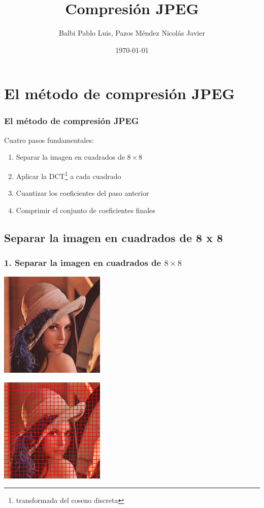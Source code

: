 \documentclass{beamer}
\begin{document}
\title{Compresión JPEG}
\author{Balbi Pablo Luis, Pazos Méndez Nicolás Javier}
\date{\today}

\begin{frame}
    \titlepage
\end{frame}

\section{El método de compresión JPEG}
\begin{frame}
    \frametitle{El método de compresión JPEG}
        Cuatro pasos fundamentales:
        \begin{enumerate}
            \item Separar la imagen en cuadrados de $8 \times 8$
            \item Aplicar la DCT\footnote{transformada del coseno discreta} a cada cuadrado
            \item Cuantizar los coeficientes del paso anterior
            \item Comprimir el conjunto de coeficientes finales
        \end{enumerate}

\end{frame}

\subsection{Separar la imagen en cuadrados de 8 x 8}

\begin{frame}
    \frametitle{1. Separar la imagen en cuadrados de $8 \times 8$}
    \begin{minipage}[t]{0.48\linewidth}
        \includegraphics[width=5cm, height=5cm]{fig/lena.jpg}
    \end{minipage}
    \hfill
    \begin{minipage}[t]{0.48\linewidth}
        \includegraphics[width=5cm, height=5cm]{fig/lena_blocks.png}
    \end{minipage}
\end{frame}
\end{document}

